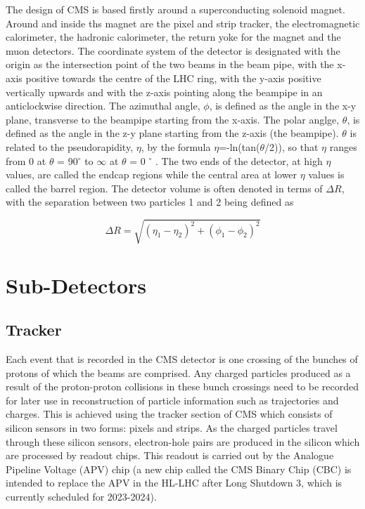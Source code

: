 The design of CMS is based firstly around a superconducting solenoid magnet. Around and inside ths magnet are
the pixel and strip tracker, the electromagnetic calorimeter, the hadronic calorimeter, the return yoke for
the magnet and the muon detectors. The coordinate system of the detector is designated with the origin as the
intersection point of the two beams in the beam pipe, with the x-axis positive towards the centre of the LHC
ring, with the y-axis positive vertically upwards and with the z-axis pointing along the beampipe in an
anticlockwise direction. The azimuthal angle, $\phi$, is defined as the angle in the x-y plane, transverse to
the beampipe starting from the x-axis. The polar anglge, $\theta$, is defined as the angle in the z-y plane
starting from the z-axis (the beampipe). $\theta$ is related to the pseudorapidity, $\eta$, by the formula
$\eta$=-ln(tan($\theta$/2)), so that $\eta$ ranges from 0 at $\theta$ = 90$^{\circ}$ to $\infty$ at $\theta$ =
0 $^{\circ}$ \cite{CMS_TDR1}. The two ends of the detector, at high $\eta$ values, are called the endcap
regions while the central area at lower $\eta$ values is called the barrel region. The detector volume is
often denoted in terms of $\Delta R$, with the separation between two particles 1 and 2 being defined as

\begin{equation}
\Delta R = \sqrt{(\eta_{1} - \eta_{2})^{2} + (\phi_{1} - \phi_{2})^{2}}
\end{equation}

\section{Sub-Detectors}
\label{s:Subdetectors}

\subsection{Tracker}
\label{ss:Tracker}

Each event that is recorded in the CMS detector is one crossing of the bunches of protons of which the beams
are comprised. Any charged particles produced as a result of the proton-proton collisions in these bunch
crossings need to be recorded for later use in reconstruction of particle information such as trajectories and
charges. This is achieved using the tracker section of CMS which consists of silicon sensors in two forms:
pixels and strips. As the charged particles travel through these silicon sensors, electron-hole pairs are
produced in the silicon which are processed by readout chips. This readout is carried out by the
Analogue Pipeline Voltage (APV) chip (a new chip called the CMS Binary Chip (CBC) is intended to replace
the APV in the HL-LHC after Long Shutdown 3, which is currently scheduled for 2023-2024).

